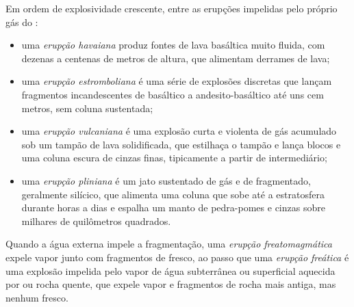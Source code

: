 \begin{definition}\label{def:b2:eruptive-styles:styles}
Em ordem de explosividade crescente, entre as erupções impelidas pelo próprio gás do :
\begin{itemize}
\item uma \emph{erupção havaiana} produz fontes de
lava basáltica muito fluida, com dezenas a centenas de metros de altura, que alimentam derrames de lava;
\item uma \emph{erupção estromboliana} é uma série de
explosões discretas que lançam fragmentos incandescentes de  basáltico a
andesito-basáltico até uns cem metros, sem coluna
sustentada;
\item uma \emph{erupção vulcaniana} é uma explosão curta e violenta
de gás acumulado sob um tampão de lava solidificada, que estilhaça
o tampão e lança blocos e uma coluna escura de cinzas finas, tipicamente a partir de
 intermediário;
\item uma \emph{erupção pliniana} é um jato sustentado de gás
e de  fragmentado, geralmente silícico, que alimenta uma coluna que sobe até a
estratosfera durante horas a dias e espalha um manto de pedra-pomes e cinzas sobre
milhares de quilômetros quadrados.
\end{itemize}
Quando a água externa impele a fragmentação, uma \emph{erupção
freatomagmática} expele vapor junto com fragmentos
de  fresco, ao passo que uma \emph{erupção freática} é uma
explosão impelida pelo vapor de água subterrânea ou superficial aquecida por  ou rocha quente,
que expele vapor e fragmentos de rocha mais antiga, mas nenhum  fresco.
\end{definition}

